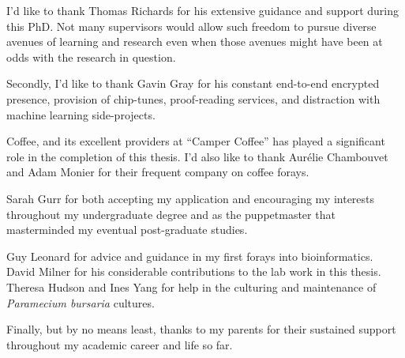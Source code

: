 
I'd like to thank Thomas Richards for his extensive guidance and support 
during this PhD. Not many supervisors
would allow such freedom to pursue diverse avenues of learning and
research even when those avenues might have been at odds with the research 
in question.

Secondly, I'd like to thank Gavin Gray 
for his constant end-to-end encrypted presence, provision of chip-tunes,
proof-reading services, and distraction with machine learning side-projects.  

Coffee, and its excellent providers at ``Camper Coffee''
has played a significant role in the completion of this thesis.
I'd also like to thank Aur\'elie Chambouvet and Adam Monier for their
frequent company on coffee forays. 

Sarah Gurr for both accepting my application and encouraging
my interests throughout my undergraduate degree and as the puppetmaster that 
masterminded my eventual post-graduate studies.

Guy Leonard for advice and guidance in my first forays into bioinformatics. 
David Milner for his considerable contributions to the lab work in this thesis.
Theresa Hudson and Ines Yang for help in the culturing and maintenance of 
\textit{Paramecium bursaria} cultures. 

Finally, but by no means least, thanks to my parents for their sustained
support throughout my academic career and life so far.  
